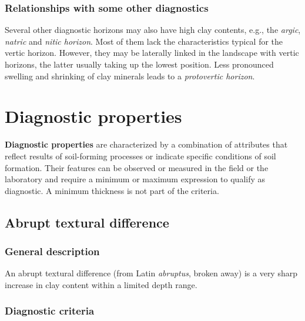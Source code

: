 \documentclass[
  letterpaper,
  DIV=11,
  numbers=noendperiod]{scrreprt}
\begin{document}
\hypertarget{relationships-with-some-other-diagnostics-38}{%
\subsubsection{Relationships with some other
diagnostics}\label{relationships-with-some-other-diagnostics-38}}

Several other diagnostic horizons may also have high clay contents,
e.g., the \emph{argic}, \emph{natric} and \emph{nitic horizon}. Most of
them lack the characteristics typical for the vertic horizon. However,
they may be laterally linked in the landscape with vertic horizons, the
latter usually taking up the lowest position. Less pronounced swelling
and shrinking of clay minerals leads to a \emph{protovertic horizon}.

\hypertarget{diagnostic-properties}{%
\section{Diagnostic properties}\label{diagnostic-properties}}

\textbf{Diagnostic properties} are characterized by a combination of
attributes that reflect results of soil-forming processes or indicate
specific conditions of soil formation. Their features can be observed or
measured in the field or the laboratory and require a minimum or maximum
expression to qualify as diagnostic. A minimum thickness is not part of
the criteria.

\hypertarget{abrupt-textural-difference}{%
\subsection{Abrupt textural
difference}\label{abrupt-textural-difference}}

\hypertarget{general-description-40}{%
\subsubsection{General description}\label{general-description-40}}

An abrupt textural difference (from Latin \emph{abruptus}, broken away)
is a very sharp increase in clay content within a limited depth range.

\hypertarget{diagnostic-criteria-40}{%
\subsubsection{Diagnostic criteria}\label{diagnostic-criteria-40}}
\end{document}
